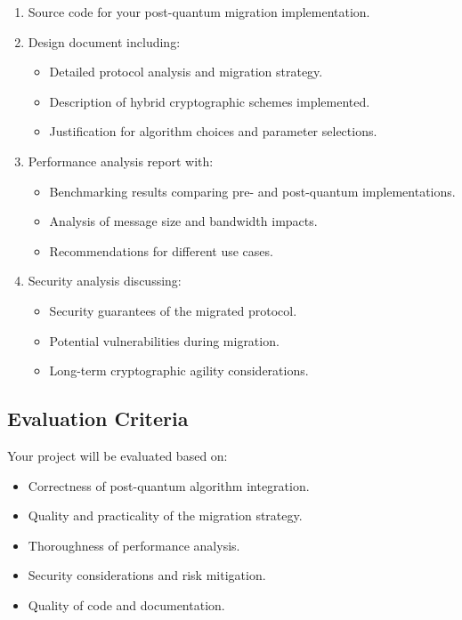 \documentclass[10pt,a4paper,american]{exam}
\begin{document}
\begin{enumerate}
	\item Source code for your post-quantum migration implementation.
	\item Design document including:
	      \begin{itemize}
		      \item Detailed protocol analysis and migration strategy.
		      \item Description of hybrid cryptographic schemes implemented.
		      \item Justification for algorithm choices and parameter selections.
	      \end{itemize}
	\item Performance analysis report with:
	      \begin{itemize}
		      \item Benchmarking results comparing pre- and post-quantum implementations.
		      \item Analysis of message size and bandwidth impacts.
		      \item Recommendations for different use cases.
	      \end{itemize}
	\item Security analysis discussing:
	      \begin{itemize}
		      \item Security guarantees of the migrated protocol.
		      \item Potential vulnerabilities during migration.
		      \item Long-term cryptographic agility considerations.
	      \end{itemize}
\end{enumerate}

\subsection*{Evaluation Criteria}
Your project will be evaluated based on:

\begin{itemize}
	\item Correctness of post-quantum algorithm integration.
	\item Quality and practicality of the migration strategy.
	\item Thoroughness of performance analysis.
	\item Security considerations and risk mitigation.
	\item Quality of code and documentation.
\end{itemize}
\end{document}
